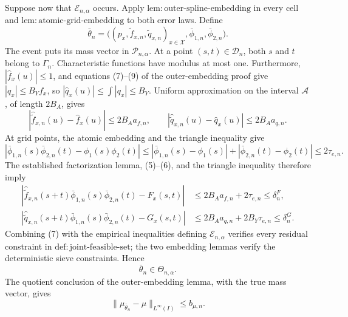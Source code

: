 Suppose now that \(\mathcal E_{n,\alpha}\) occurs.  Apply
\(\mathrm{lem{:}outer\text{-}spline\text{-}embedding}\) in every cell and
\(\mathrm{lem{:}atomic\text{-}grid\text{-}embedding}\) to both error laws.
Define
\[
 \bar\theta_n=
 \bigl((p_x,\widetilde f_{x,n},\widetilde q_{x,n})_{x\in\mathcal X},
       \bar\phi_{1,n},\bar\phi_{2,n}\bigr).
\]
The event puts its mass vector in \(\mathcal P_{n,\alpha}\).  At a point
\((s,t)\in\mathcal D_n\), both \(s\) and \(t\) belong to \(\Gamma_n\).
Characteristic functions have modulus at most one.  Furthermore,
\(|\widehat f_x(u)|\le1\), and equations (7)--(9) of the outer-embedding
proof give \(|q_x|\le B_Yf_x\), so
\(|\widehat q_x(u)|\le\int|q_x|\le B_Y\).  Uniform approximation on the
interval \(\mathcal A\), of length \(2B_A\), gives
\[
 |\widehat{\widetilde f}_{x,n}(u)-\widehat f_x(u)|
 \le2B_Aa_{f,n},
 \qquad
 |\widehat{\widetilde q}_{x,n}(u)-\widehat q_x(u)|
 \le2B_Aa_{q,n}.                                                    \tag{5}
\]
At grid points, the atomic embedding and the triangle inequality give
\[
 |\bar\phi_{1,n}(s)\bar\phi_{2,n}(t)-\phi_1(s)\phi_2(t)|
 \le|\bar\phi_{1,n}(s)-\phi_1(s)|
   +|\bar\phi_{2,n}(t)-\phi_2(t)|
 \le2\tau_{e,n}.                                                    \tag{6}
\]
The established factorization lemma, (5)--(6), and the triangle inequality
therefore imply
\[
 \begin{aligned}
 |\widehat{\widetilde f}_{x,n}(s+t)
   \bar\phi_{1,n}(s)\bar\phi_{2,n}(t)-F_x(s,t)|
 &\le2B_Aa_{f,n}+2\tau_{e,n}\le\delta^F_n,\\
 |\widehat{\widetilde q}_{x,n}(s+t)
   \bar\phi_{1,n}(s)\bar\phi_{2,n}(t)-G_x(s,t)|
 &\le2B_Aa_{q,n}+2B_Y\tau_{e,n}\le\delta^G_n.                    \tag{7}
 \end{aligned}
\]
Combining (7) with the empirical inequalities defining
\(\mathcal E_{n,\alpha}\) verifies every residual constraint in
\(\mathrm{def{:}joint\text{-}feasible\text{-}set}\); the two embedding
lemmas verify the deterministic sieve constraints.  Hence
\[
 \bar\theta_n\in\Theta_{n,\alpha}.                                 \tag{8}
\]
The quotient conclusion of the outer-embedding lemma, with the true mass
vector, gives
\[
 \|\mu_{\bar\theta_n}-\mu\|_{L^\infty(I)}\le b_{\mu,n}.           \tag{9}
\]

